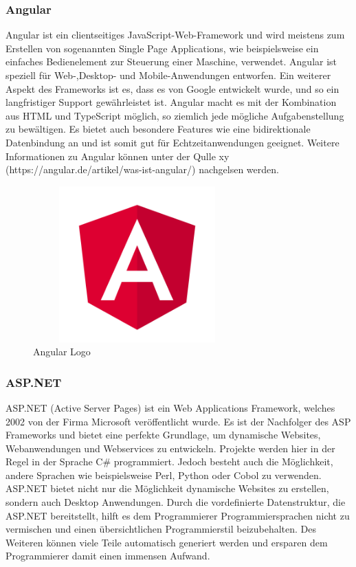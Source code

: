 \subsubsection{Angular}
Angular ist ein clientseitiges JavaScript-Web-Framework und wird meistens zum Erstellen von sogenannten Single Page Applications, wie beispielsweise ein einfaches Bedienelement zur Steuerung einer Maschine, verwendet. Angular ist speziell für Web-,Desktop- und Mobile-Anwendungen entworfen. Ein weiterer Aspekt des Frameworks ist es, dass es von Google entwickelt wurde, und so ein langfristiger Support gewährleistet ist. Angular macht es mit der Kombination aus HTML und TypeScript möglich, so ziemlich jede mögliche Aufgabenstellung zu bewältigen. Es bietet auch besondere Features wie eine bidirektionale Datenbindung an und ist somit gut für Echtzeitanwendungen geeignet. 
Weitere Informationen zu Angular können unter der Qulle xy (https://angular.de/artikel/was-ist-angular/) nachgelsen werden.
\begin{figure}[h]
	\centering
	\includegraphics[height=6cm,width=8cm]{images/Angular_Logo}
	\caption{Angular Logo}
	\label{fig:Angular Logo}
\end{figure}
\newpage
\subsubsection{ASP.NET}
ASP.NET (Active Server Pages) ist ein Web Applications Framework, welches 2002 von der Firma Microsoft veröffentlicht wurde. Es ist der Nachfolger des ASP Frameworks und bietet eine perfekte Grundlage, um dynamische Websites, Webanwendungen und Webservices zu entwickeln. Projekte werden hier in der Regel in der Sprache C\# programmiert. Jedoch besteht auch die Möglichkeit, andere Sprachen wie beispielsweise Perl, Python oder Cobol zu verwenden. ASP.NET bietet nicht nur die Möglichkeit dynamische Websites zu erstellen, sondern auch Desktop Anwendungen.
Durch die vordefinierte Datenstruktur, die ASP.NET bereitstellt, hilft es dem Programmierer Programmiersprachen nicht zu vermischen und einen übersichtlichen Programmierstil beizubehalten. Des Weiteren können viele Teile automatisch generiert werden und ersparen dem Programmierer damit einen immensen Aufwand.

